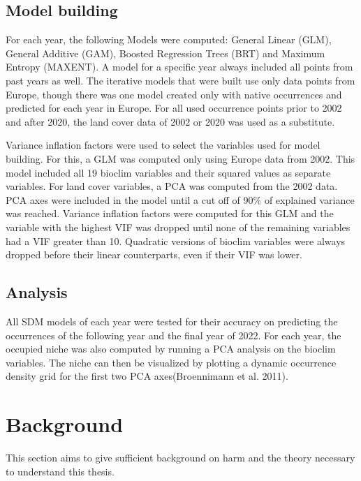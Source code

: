 \documentclass[12pt,a4paper]{article}
\begin{document}
\subsection{Model building}
For each year, the following Models were computed: General Linear (GLM), General Additive (GAM), Boosted Regression Trees (BRT) and Maximum Entropy (MAXENT).  
A model for a specific year always included all points from past years as well.
The iterative models that were built use only data points from Europe, though there was one model created only with native occurrences and predicted for each year in Europe.
For all used occurrence points prior to 2002 and after 2020, the land cover data of 2002 or 2020 was used as a substitute.

Variance inflation factors were used to select the variables used for model building. 
For this, a GLM was computed only using Europe data from 2002.
This model included all 19 bioclim variables and their squared values as separate variables.
For land cover variables, a PCA was computed from the 2002 data.
PCA axes were included in the model until a cut off of 90\% of explained variance was reached.
Variance inflation factors were computed for this GLM and the variable with the highest VIF was dropped until none of the remaining variables had a VIF greater than 10. Quadratic versions of bioclim variables were always dropped before their linear counterparts, even if their VIF was lower.

\subsection{Analysis}
All SDM models of each year were tested for their accuracy on predicting the occurrences of the following year and the final year of 2022. 
For each year, the occupied niche was also computed by running a PCA analysis on the bioclim variables. The niche can then be visualized by plotting a dynamic occurrence density grid for the first two PCA axes(Broennimann et al. 2011).



\newpage
\section{Background}
This section aims to give sufficient background on \gls{harm} and the theory necessary to understand this thesis.
\end{document}
